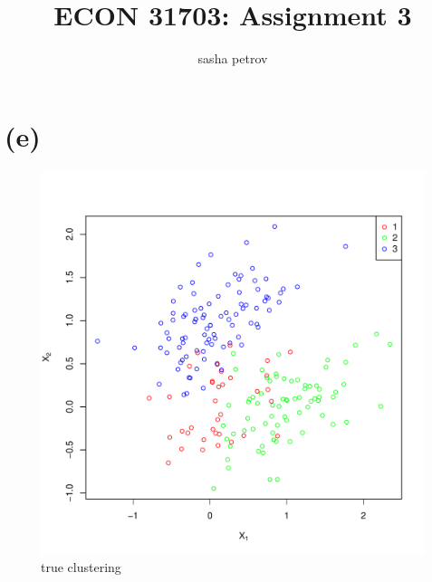 \documentclass[a4paper,12pt,twoside]{article}
\title{ECON 31703: Assignment 3}
\author{sasha petrov}
\begin{document}
\maketitle

\section*{(e)}

\begin{figure}[ht]
        \begin{minipage}[t]{0.45\linewidth}
            \centering
            \includegraphics[width = \textwidth, keepaspectratio]{true_clustering.pdf}
                       \caption{true clustering}
            \label{fig:a}
        \end{minipage}
        \hspace{0.5cm}
        \begin{minipage}[t]{0.45\linewidth}
            \centering

\end{minipage}
\end{figure}
\end{document}
